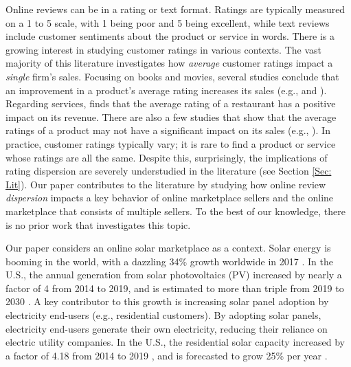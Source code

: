 \documentclass[msom,blindrev]{informs3}
\begin{document}


Online reviews can be in a rating or text format. Ratings are typically measured on a 1 to 5 scale, with 1 being poor and 5 being excellent, while text reviews include customer sentiments about the product or service in words.  There is a growing interest in studying customer ratings in various contexts. The vast majority of this literature investigates how \emph{average} customer ratings impact a \emph{single} firm's sales. Focusing on books and movies, several studies conclude that an improvement in a product's average rating
increases its sales (e.g., \cite{chintagunta2010effects} and \cite{chevalier2006effect}). Regarding services, \cite{luca2016reviews} finds that the average rating of a restaurant has a positive impact on its revenue. There are also a few studies that show that the average ratings of a product may not have a significant impact on its sales (e.g., \cite{duan2008online}).  In practice, customer ratings typically vary; it is rare to find a product or service whose ratings are all the same. Despite this, surprisingly, the implications of rating dispersion are severely understudied in the literature (see Section \ref{Sec: Lit}). Our paper contributes to the literature by studying how online review \emph{dispersion} impacts  a key behavior of online marketplace sellers and the online marketplace that consists of multiple sellers. To the best of our knowledge, there is no prior work that investigates this topic.


Our paper considers an online solar marketplace as a context. Solar energy is booming in the world, with a dazzling 34\% growth worldwide in 2017 \citep{iea2018snapshot}. In the U.S., the annual generation from solar photovoltaics (PV) increased by nearly a factor of 4 from 2014 to 2019, and is estimated to more than triple from 2019 to 2030 \citep{USEIA-I,USEIA-II}. A key contributor to this growth is increasing solar panel adoption by electricity end-users (e.g., residential customers). By adopting solar panels, electricity end-users generate their own electricity, reducing their reliance on electric utility companies. In the U.S., the residential solar capacity increased by a factor of 4.18 from 2014 to 2019 \citep{USEIA-III}, and is forecasted to grow 25\% per year \citep{weaver_2019,seia,gtmsolar2018}.
\end{document}

